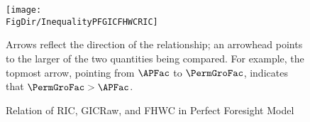 \begin{figure}[ht]
  \label{fig:InequalityPFGICFHWCRIC}
  \centerline{
    \texttt{[image: \\FigDir/InequalityPFGICFHWCRIC]}
  }
  \caption{Relation of {RIC}, {GICRaw}, and {FHWC} in Perfect Foresight Model}
  \footnotesize{Arrows reflect the direction of the relationship; an arrowhead points to the larger of the two quantities being compared.  For example, the topmost arrow, pointing from $\APFac$ to $\PermGroFac$, indicates that $\PermGroFac > \APFac$.}
\end{figure}
